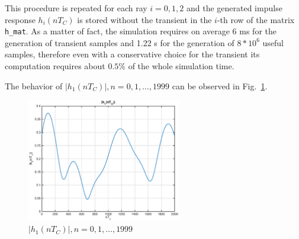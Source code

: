 \documentclass[10pt]{article}
\begin{document}
This procedure is repeated for each ray $i = 0, 1, 2$ and the generated impulse response $h_i(nT_C)$ is stored without the transient in the $i$-th row of the matrix \texttt{h\_mat}. As a matter of fact, the simulation requires on average 6 ms for the generation of transient samples and 1.22 s for the generation of $8*10^6$ useful samples, therefore even with a conservative choice for the transient its computation requires about $0.5\%$ of the whole simulation time.

The behavior of $|h_1(nT_C)|, n = 0, 1, \dots, 1999$ can be observed in Fig.~\ref{fig:h1}.

\begin{figure}[h!]
  \centering
  \includegraphics[width = 0.6\textwidth]{p01_h1}
  \caption{$|h_1(nT_C)|, n = 0, 1, \dots, 1999$}
  \label{fig:h1}
\end{figure}
\end{document}
